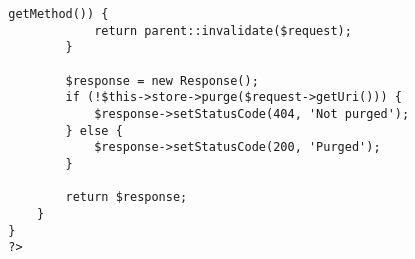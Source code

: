 \documentclass[11pt,a4paper]{report}
\begin{document}
    \begin{verbatim}
        getMethod()) {
                    return parent::invalidate($request);
                }

                $response = new Response();
                if (!$this->store->purge($request->getUri())) {
                    $response->setStatusCode(404, 'Not purged');
                } else {
                    $response->setStatusCode(200, 'Purged');
                }

                return $response;
            }
        }
        ?>
    \end{verbatim}
\end{document}
